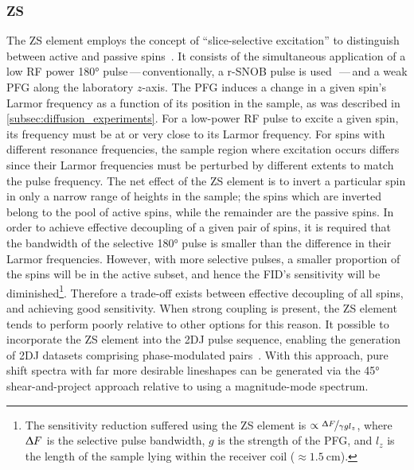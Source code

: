 \subsubsection{\ac{ZS}}
\label{subsec:ZS}
The \ac{ZS} element employs the concept of ``slice-selective excitation'' to
distinguish between active and passive spins~\cite{Zangger1997,Aguilar2010}. It
consists of the simultaneous application of a low \ac{RF} power \ang{180}
pulse\,---\,conventionally, a r-SNOB pulse is used~\cite{Kupce1995}\,---\,and a
weak \ac{PFG} along the laboratory $z$-axis.
The \ac{PFG} induces a change in a given spin's Larmor frequency as a
function of its position in the sample, as was described in
\cref{subsec:diffusion_experiments}. For a low-power \ac{RF} pulse to excite
a given spin, its frequency must be at or very close to its Larmor
frequency.
For spins with different resonance frequencies, the sample region where
excitation occurs differs since their Larmor frequencies must be perturbed by
different extents to match the pulse frequency.
The net effect of the \ac{ZS} element is to invert a particular spin in only a
narrow range of heights in the sample; the spins which are inverted belong to
the pool of active spins, while the remainder are the passive spins.
In order to achieve effective decoupling of a given pair of spins, it is required
that the bandwidth of the selective \ang{180} pulse is smaller than the
difference in their Larmor frequencies. However, with more selective pulses,
a smaller proportion of the spins will be in the active subset, and hence the
\ac{FID}'s sensitivity will be diminished\footnote{
    The sensitivity reduction suffered using the \ac{ZS} element is $\propto
    \nicefrac{\Updelta F}{\gamma g l_z}$, where $\Updelta F$ is the selective
    pulse bandwidth, $g$ is the strength of the \ac{PFG}, and $l_z$ is the
    length of the sample lying within the receiver coil ($\approx
    \qty{1.5}{\centi\meter}$).
}.
Therefore a trade-off exists between effective decoupling of all spins, and
achieving good sensitivity. When strong coupling is present,
the \ac{ZS} element tends to perform poorly relative to other options for this
reason. It possible to incorporate the \ac{ZS} element into the \ac{2DJ} pulse
sequence, enabling the generation of \ac{2DJ} datasets comprising
phase-modulated pairs~\cite{Pell2007}. With this approach, pure
shift spectra with far more desirable lineshapes can be generated via the
\ang{45} shear-and-project approach relative to using a magnitude-mode
spectrum.

